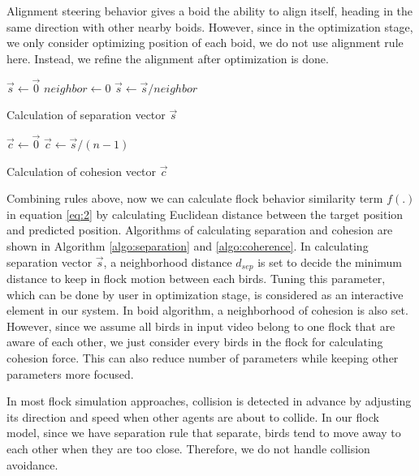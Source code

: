 Alignment steering behavior gives a boid the ability to align itself, heading in the same direction with other nearby boids. However, since in the optimization stage, we only consider optimizing position of each boid, we do not use alignment rule here. Instead, we refine the alignment after optimization is done.


\begin{algorithm}[h]
\SetAlgoLined
{}
$\vec{s} \leftarrow \vec{0}$ \;
$neighbor \leftarrow 0 $ \;
$\vec{s} \leftarrow \vec{s} / neighbor$ \;
\caption{Calculation of separation vector $\vec{s}$}
\label{algo:separation}
\end{algorithm}


\begin{algorithm}[h]
\SetAlgoLined
{}
$\vec{c} \leftarrow \vec{0}$ \;
$\vec{c} \leftarrow \vec{s} / (n-1)$ \;
\caption{Calculation of cohesion vector $\vec{c}$}
\label{algo:coherence}
\end{algorithm}


Combining rules above, now we can calculate flock behavior similarity term $f(.)$ in equation \ref{eq:2} by calculating Euclidean distance between the target position and predicted position. Algorithms of calculating separation and cohesion are shown in Algorithm \ref{algo:separation} and \ref{algo:coherence}. In calculating separation vector $\vec{s}$, a neighborhood distance $d_{sep}$ is set to decide the minimum distance to keep in flock motion between each birds. Tuning this parameter, which can be done by user in optimization stage, is considered as an interactive element in our system. In boid algorithm, a neighborhood of cohesion is also set. However, since we assume all birds in input video belong to one flock that are aware of each other, we just consider every birds in the flock for calculating cohesion force. This can also reduce number of parameters while keeping other parameters more focused.


In most flock simulation approaches, collision is detected in advance by adjusting its direction and speed when other agents are about to collide. In our flock model, since we have separation rule that separate, birds tend to move away to each other when they are too close. Therefore, we do not handle collision avoidance.


